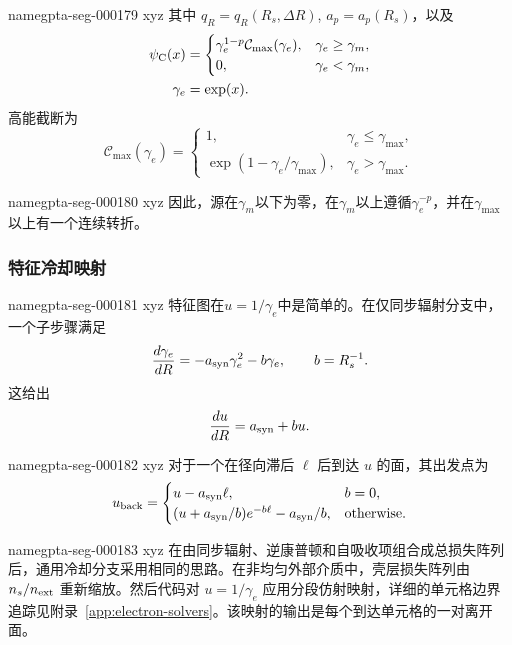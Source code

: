 \documentclass[twocolumn]{aastex702}
\makeatletter
\providecommand{\gptareaderanchor}[1]{\pdfdest name{#1} xyz}%
\providecommand{\gptareaderanchor}[1]{\special{pdf:dest (#1) [ @thispage /XYZ @xpos @ypos null ]}}%
\makeatother
\begin{document}
\gptareaderanchor{gpta-seg-000179}%
其中 \(q_R=q_R(R_s,\Delta R)\), \(a_p=a_p(R_s)\)，以及
\begin{equation}
\begin{aligned}
\psi_{\rm C}(x)&=
\begin{cases}
\gamma_e^{1-p}\mathcal C_{\max}(\gamma_e),
&\gamma_e\ge\gamma_m,\\
0,&\gamma_e<\gamma_m,
\end{cases}\\
\gamma_e&=\exp(x) .
\end{aligned}
\end{equation}
高能截断为
\begin{equation}
\mathcal{C}_{\max}(\gamma_e)=
\begin{cases}
1, & \gamma_e\le\gamma_{\max},\\
\exp(1-\gamma_e/\gamma_{\max}), & \gamma_e>\gamma_{\max}.
\end{cases}
\end{equation}

\gptareaderanchor{gpta-seg-000180}%
因此，源在\(\gamma_m\)以下为零，在\(\gamma_m\)以上遵循\(\gamma_e^{-p}\)，并在\(\gamma_{\max}\)以上有一个连续转折。

\subsubsection{特征冷却映射}


\gptareaderanchor{gpta-seg-000181}%
特征图在\(u=1/\gamma_e\)中是简单的。在仅同步辐射分支中，一个子步骤满足
\begin{equation}
\frac{d\gamma_e}{dR}=-a_{\rm syn}\gamma_e^2-b\gamma_e,
\qquad b=R_s^{-1}.
\end{equation}
这给出
\begin{equation}
\frac{du}{dR}=a_{\rm syn}+bu .
\end{equation}

\gptareaderanchor{gpta-seg-000182}%
对于一个在径向滞后 \(\ell\) 后到达 \(u\) 的面，其出发点为
\begin{equation}
u_{\rm back}=
\begin{cases}
u-a_{\rm syn}\ell, & b=0,\\
(u+a_{\rm syn}/b)e^{-b\ell}-a_{\rm syn}/b, & {\rm otherwise}.
\end{cases}
\end{equation}

\gptareaderanchor{gpta-seg-000183}%
在由同步辐射、逆康普顿和自吸收项组合成总损失阵列后，通用冷却分支采用相同的思路。在非均匀外部介质中，壳层损失阵列由 \(n_s/n_{\rm ext}\) 重新缩放。然后代码对 \(u=1/\gamma_e\) 应用分段仿射映射，详细的单元格边界追踪见附录~\ref{app:electron-solvers}。该映射的输出是每个到达单元格的一对离开面。
\end{document}
